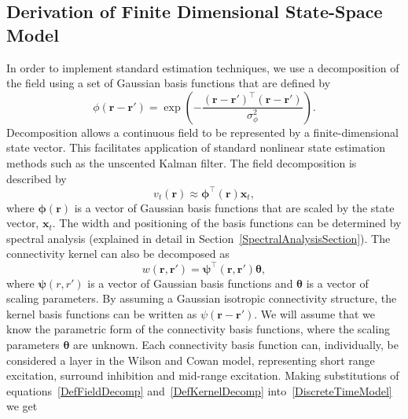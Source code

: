 \documentclass[10pt,a4paper]{article}
\begin{document}
\subsection{Derivation of Finite Dimensional State-Space Model} 
In order to implement standard estimation techniques, we use a decomposition of the field using a set of Gaussian basis functions that are defined by
\begin{equation}\label{eq:FieldBasisFunction}
	\phi\left(\mathbf{r}-\mathbf{r}'\right) =
\exp{\left(-\frac{(\mathbf{r}-\mathbf{r}')^\top(\mathbf{r}-\mathbf{r}')}{\sigma_{\phi}^2}\right)}. 
\end{equation}
Decomposition allows a continuous field to be represented by a finite-dimensional state vector. This facilitates application of standard nonlinear state estimation methods such as the unscented Kalman filter. The field decomposition is described by 
\begin{equation}
	\label{DefFieldDecomp} v_t\left(\mathbf{r}\right) \approx \boldsymbol{\phi}^{\top}\left(\mathbf{r}\right) \mathbf{x}_t, 
\end{equation}
where $\mathbf{\boldsymbol{\phi}}(\mathbf{r})$ is a vector of Gaussian basis functions that are scaled by the state vector, $\mathbf{x}_t$. %
The width and positioning of the basis functions can be determined by spectral analysis (explained in detail in Section~\ref{SpectralAnalysisSection}). The connectivity kernel can also be decomposed as 
\begin{equation}\label{DefKernelDecomp}
	 w\left(\mathbf{r},\mathbf{r}'\right) =\boldsymbol{\psi}^\top\left(\mathbf{r},\mathbf{r}'\right) \boldsymbol{\theta},
\end{equation}
where $\boldsymbol{\psi}(r,r')$ is a vector of Gaussian basis functions and $\boldsymbol{\theta}$ is a vector of scaling parameters. By assuming a Gaussian isotropic connectivity structure, the kernel basis functions can be written as $\psi(\mathbf{r}-\mathbf{r}')$. We will assume that we know the parametric form of the connectivity basis functions, where the scaling parameters $\boldsymbol{\theta}$ are unknown. Each connectivity basis function can, individually, be considered a layer in the Wilson and Cowan model, representing short range excitation, surround inhibition and mid-range excitation. Making substitutions of equations~\ref{DefFieldDecomp} and~\ref{DefKernelDecomp} into~\ref{DiscreteTimeModel} we get 
\end{document}
